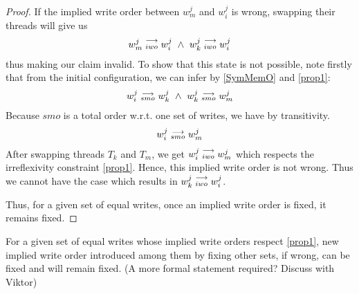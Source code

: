 \begin{proof}
            If the implied write order between $w_m^j$ and $w_i^j$ is wrong, swapping their threads will give us 
            \begin{align}
                \reln{w_m^j}{iwo}{w_i^j} \ \wedge \ \reln{w_k^j}{iwo}{w_i^j}  
            \end{align}
            thus making our claim invalid. To show that this state is not possible, note firstly that from the initial configuration, we can infer by \ref{SymMemO} and \ref{prop1}:
            \begin{align}
                \reln{w_i^j}{smo}{w_k^j} \ \wedge \ \reln{w_k^j}{smo}{w_m^j}
            \end{align} 
            Because $smo$ is a total order w.r.t. one set of writes, we have by transitivity. 
            \begin{align}
                w_i^j\stackrel{\longrightarrow}{_{smo}}w_m^j
            \end{align}
            After swapping threads $T_k$ and $T_m$, we get $w_i^j\stackrel{\longrightarrow}{_{iwo}}w_m^j$ which respects the irreflexivity constraint \ref{prop1}. Hence, this implied write order is not wrong. Thus we cannot have the case which results in $w_k^j\stackrel{\longrightarrow}{_{iwo}}w_i^j$.  


            Thus, for a given set of equal writes, once an implied write order is fixed, it remains fixed.
        \end{proof}


        \begin{lemma}
            For a given set of equal writes whose implied write orders respect \ref{prop1},  new implied write order introduced among them by fixing other sets, if wrong, can be fixed and will remain fixed. 
            (A more formal statement required? Discuss with Viktor)        
        \end{lemma}

